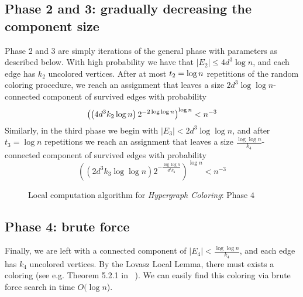 \documentclass[english, oribibl]{llncs}
\begin{document}
\subsection{Phase 2 and 3: gradually decreasing the component size}
Phase 2 and 3 are simply iterations of the general phase with parameters as described below.
With high probability we have that $|E_2| \leq 4d^3\log n$,
and each edge has $k_2$ uncolored vertices.
After at most $t_2 = \log n$ repetitions of the random coloring procedure, 
we reach an assignment that leaves a size $2d^3\log\log n$-connected component of survived edges with probability
$$\left( \left(4d^3k_2\log n\right) 2^{-2\log\log n} \right)
					^{\log n} < n^{-3}$$
Similarly, in the third phase we begin with $|E_3| < 2d^3\log\log n$, and after $t_3 = \log n$ repetitions
we reach an assignment that leaves a size $\frac{\log\log n}{k_4}$-connected component of survived edges with probability
$$\left( \left(2d^3k_3\log\log n\right) 2^{-\frac{\log\log n}{d^3k_4}}\right)
					^{\log n} < n^{-3}$$


\begin{figure*}
\begin{center}
\end{center}
\caption{Local computation algorithm for \emph{Hypergraph Coloring}: Phase $4$}
\label{Fig:Phase4}
\end{figure*}






\subsection{Phase 4: brute force}
Finally, we are left with a connected component of $|E_4| < \frac{\log\log n}{k_4}$, 
and each edge has $k_4$ uncolored vertices. 
By the Lovasz Local Lemma, there must exists a coloring (see e.g. Theorem 5.2.1 in ~\cite{Alo91}).
We can easily find this coloring via brute force search in time $O(\log n$).
\end{document}
